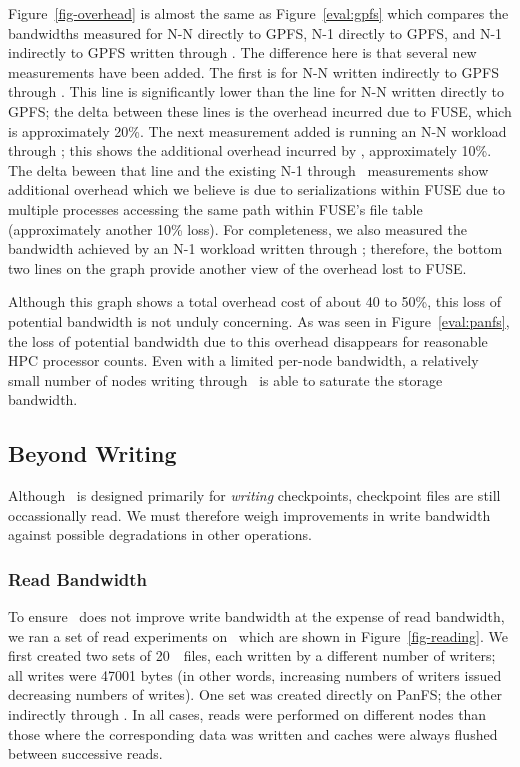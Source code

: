 Figure~\ref{fig-overhead} is almost the same as Figure~\ref{eval:gpfs} which
compares the bandwidths measured for N-N directly to GPFS, N-1 directly to
GPFS, and N-1 indirectly to GPFS written through \plfs. The difference here is
that several new measurements have been added. The first is for N-N written
indirectly to GPFS through \noopfs. This line is significantly lower than the
line for N-N written directly to GPFS; the delta between these lines is the
overhead incurred due to FUSE, which is approximately 20\%. The next
measurement added is running an N-N workload through \plfs; this shows the
additional overhead incurred by \plfs, approximately 10\%. 
The delta beween that line and the existing N-1 through \plfs\
measurements show additional overhead which we believe is due to serializations
within FUSE due to multiple processes accessing the same path within FUSE's
file table (approximately another 10\% loss). For completeness, we also
measured the bandwidth achieved by an N-1 workload written through \noopfs;
therefore, the bottom two lines on the graph provide another view of the
overhead lost to FUSE.

Although this graph shows a total overhead cost of about 40 to 50\%, this loss
of potential bandwidth is not unduly concerning. As was seen in
Figure~\ref{eval:panfs}, the loss of potential bandwidth due to this overhead
disappears for reasonable HPC processor counts. Even with a limited per-node
bandwidth, a relatively small number of nodes writing through \plfs\ is able to
saturate the storage bandwidth. 


\subsection{Beyond Writing}
Although \plfs\ is designed primarily for {\em writing} checkpoints,
checkpoint files are still occassionally read.
We must therefore weigh improvements in 
write bandwidth against possible degradations in other operations. 

\subsubsection{Read Bandwidth}

To ensure \plfs\ does not improve write bandwidth at the expense of read
bandwidth, we ran a set of read experiments on \rrz\ which are shown in
Figure~\ref{fig-reading}. We first created two sets of 20~\GB\ files, each
written by a different number of writers; all writes were 47001 bytes (in other
words, increasing numbers of writers issued decreasing numbers of writes). One
set was created directly on PanFS; the other indirectly through \plfs. In all
cases, reads were performed on different nodes than those where the
corresponding data was written and caches were always flushed between
successive reads.

